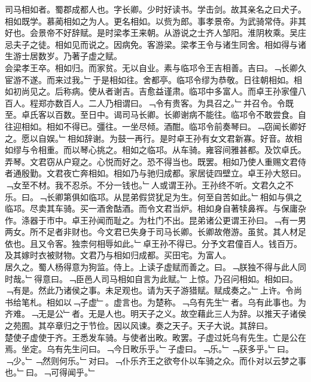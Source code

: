 \documentclass{zhvt-classic}
\begin{document}

\hspace*{2em}司马相如者。蜀郡成都人也。字长卿。少时好读书。学击剑。故其亲名之曰犬子。相如既学。慕蔺相如之为人。更名相如。以赀为郎。事孝景帝。为武骑常侍。非其好也。会景帝不好辞赋。是时梁孝王来朝。从游说之士齐人邹阳。淮阴枚乘。吴庄忌夫子之徒。相如见而说之。因病免。客游梁。梁孝王令与诸生同舍。相如得与诸生游士居数岁。乃著子虚之赋。\\
\hspace*{2em}会梁孝王卒。相如归。而家贫。无以自业。素与临邛令王吉相善。吉曰。﹁长卿久宦游不遂。而来过我。﹂于是相如往。舍都亭。临邛令缪为恭敬。日往朝相如。相如初尚见之。后称病。使从者谢吉。吉愈益谨肃。临邛中多富人。而卓王孙家僮八百人。程郑亦数百人。二人乃相谓曰。﹁令有贵客。为具召之。﹂并召令。令既至。卓氏客以百数。至日中。谒司马长卿。长卿谢病不能往。临邛令不敢尝食。自往迎相如。相如不得已。彊往。一坐尽倾。酒酣。临邛令前奏琴曰。﹁窃闻长卿好之。愿以自娱。﹂相如辞谢。为鼓一再行。是时卓王孙有女文君新寡。好音。故相如缪与令相重。而以琴心挑之。相如之临邛。从车骑。雍容间雅甚都。及饮卓氏。弄琴。文君窃从户窥之。心悦而好之。恐不得当也。既罢。相如乃使人重赐文君侍者通殷勤。文君夜亡奔相如。相如乃与驰归成都。家居徒四壁立。卓王孙大怒曰。﹁女至不材。我不忍杀。不分一钱也。﹂人或谓王孙。王孙终不听。文君久之不乐。曰。﹁长卿第俱如临邛。从昆弟假贷犹足为生。何至自苦如此。﹂相如与俱之临邛。尽卖其车骑。买一酒舍酤酒。而令文君当炉。相如身自著犊鼻裈。与保庸杂作。涤器于市中。卓王孙闻而耻之。为杜门不出。昆弟诸公更谓王孙曰。﹁有一男两女。所不足者非财也。今文君已失身于司马长卿。长卿故倦游。虽贫。其人材足依也。且又令客。独柰何相辱如此。﹂卓王孙不得已。分予文君僮百人。钱百万。及其嫁时衣被财物。文君乃与相如归成都。买田宅。为富人。\\
\hspace*{2em}居久之。蜀人杨得意为狗监。侍上。上读子虚赋而善之。曰。﹁朕独不得与此人同时哉。﹂得意曰。﹁臣邑人司马相如自言为此赋。﹂上惊。乃召问相如。相如曰。﹁有是。然此乃诸侯之事。未足观也。请为天子游猎赋。赋成奏之。﹂上许。令尚书给笔札。相如以﹁子虚﹂。虚言也。为楚称。﹁乌有先生﹂者。乌有此事也。为齐难。﹁无是公﹂者。无是人也。明天子之义。故空藉此三人为辞。以推天子诸侯之苑囿。其卒章归之于节俭。因以风谏。奏之天子。天子大说。其辞曰。\\
\hspace*{2em}楚使子虚使于齐。王悉发车骑。与使者出畋。畋罢。子虚过奼乌有先生。亡是公在焉。坐定。乌有先生问曰。﹁今日畋乐乎。﹂子虚曰。﹁乐。﹂﹁获多乎。﹂曰。﹁少。﹂﹁然则何乐。﹂对曰。﹁仆乐齐王之欲夸仆以车骑之众。而仆对以云梦之事也。﹂曰。﹁可得闻乎。﹂\\
\end{document}
